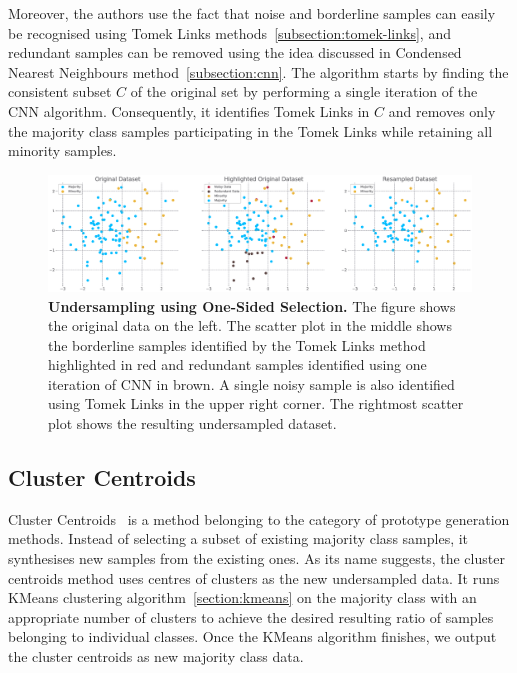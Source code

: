 Moreover, the authors use the fact that noise and borderline samples can easily be recognised using
Tomek Links methods~\ref{subsection:tomek-links}, and redundant samples can be removed using the
idea discussed in Condensed Nearest Neighbours method~\ref{subsection:cnn}. The algorithm starts by
finding the consistent subset $C$ of the original set by performing a single iteration of the CNN
algorithm. Consequently, it identifies Tomek Links in $C$ and removes only the majority class
samples participating in the Tomek Links while retaining all minority samples.

\begin{figure}
    \centering
    \includegraphics[width=\linewidth]{figures/oss.eps}
    \caption{
        \textbf{Undersampling using One-Sided Selection.} The figure shows the original data on the
        left. The scatter plot in the middle shows the borderline samples identified by the Tomek
        Links method highlighted in red and redundant samples identified using one iteration of CNN
        in brown. A single noisy sample is also identified using Tomek Links in the upper right
        corner. The rightmost scatter plot shows the resulting undersampled dataset.
    }
    \label{figure:oss}
\end{figure}


\subsection{Cluster Centroids}
\label{subsection:cluster-centroids}

Cluster Centroids~\cite{cluster-centroids} is a method belonging to the category of prototype
generation methods. Instead of selecting a subset of existing majority class samples, it
synthesises new samples from the existing ones. As its name suggests, the cluster centroids method
uses centres of clusters as the new undersampled data. It runs KMeans clustering
algorithm~\ref{section:kmeans} on the majority class with an appropriate number of clusters to
achieve the desired resulting ratio of samples belonging to individual classes. Once the KMeans
algorithm finishes, we output the cluster centroids as new majority class data.

